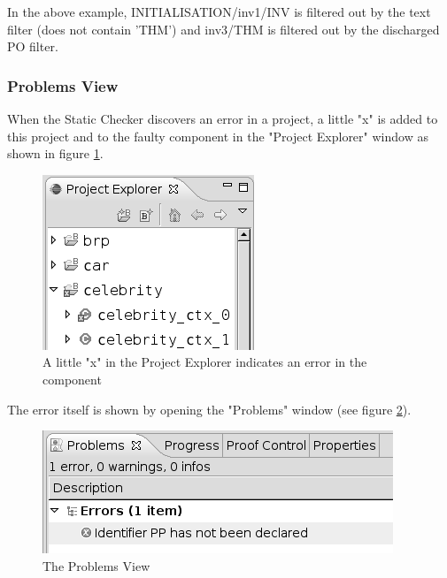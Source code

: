 In the above example, INITIALISATION/inv1/INV is filtered out by the text filter (does not contain 'THM') and inv3/THM is filtered out by the discharged PO filter. 

\subsubsection{Problems View}
\label{reference_01_the_problems_view}

When the Static Checker discovers an error in a project, a little "x" is added to this project and to the faulty component in the "Project Explorer" window as shown in figure \ref{fig_ref_01_problemsview1}.

\begin{figure}[!h]
\begin{center}
	\includegraphics{img/reference/ref_01_problemsview1.png}
	\caption{A little "x" in the Project Explorer indicates an error in the component}
	\label{fig_ref_01_problemsview1}
\end{center}
\end{figure}

The error itself is shown by opening the "Problems" window (see figure \ref{fig_ref_01_problemsview2}). 

\begin{figure}[!h]
\begin{center}
	\includegraphics{img/reference/ref_01_problemsview2.png}
	\caption{The Problems View}
	\label{fig_ref_01_problemsview2}
\end{center}
\end{figure}

